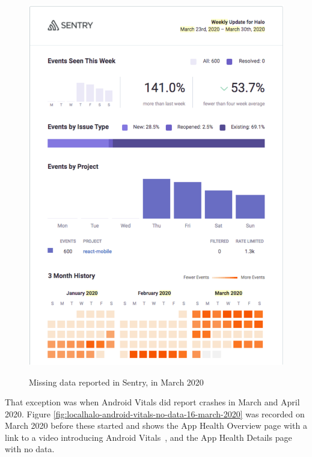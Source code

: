 \begin{figure}[htbp!]
\begin{minipage}{.45\textwidth}
  \label{fig:localhalo-sentry-weekly-report-16-mar-2020}
\end{minipage}\hfill%
\begin{minipage}{.45\textwidth}
  \centering
  \includegraphics[width=\textwidth]{images/localhalo/sentry-weekly-report-23-mar-2020.pdf}
  \label{fig:localhalo-sentry-weekly-report-23-mar-2020}
\end{minipage}
    \caption{Missing data reported in Sentry, in March 2020}
    \label{fig:sentry-missing-data-march-2020}
\end{figure}

That exception was when Android Vitals did report crashes in March and April 2020. Figure \ref{fig:localhalo-android-vitals-no-data-16-march-2020} was recorded on  March 2020 before these started and shows the App Health Overview page with a link to a video introducing Android Vitals~, and the App Health Details page with no data.

